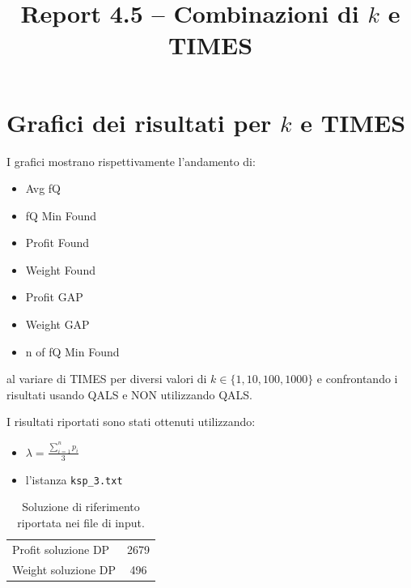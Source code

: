 \documentclass[a4paper,12pt]{article}
\title{Report 4.5 -- Combinazioni di $k$ e TIMES}
\begin{document}
\maketitle

\newpage

\section{Grafici dei risultati per $k$ e TIMES}

I grafici mostrano rispettivamente l'andamento di:
\begin{itemize}
    \item Avg fQ
    \item fQ Min Found
    \item Profit Found
    \item Weight Found
    \item Profit GAP
    \item Weight GAP
    \item n of fQ Min Found
\end{itemize}
al variare di TIMES per diversi valori di $k \in \{1,10,100,1000\}$ e confrontando
i risultati usando QALS e NON utilizzando QALS.

I risultati riportati sono stati ottenuti utilizzando:

\begin{itemize}
   \item $\lambda = \frac{\sum_{i=1}^{n} p_i}{3}$
    \item l'istanza \texttt{ksp\_3.txt}
\end{itemize}

\begin{table}[H]
\centering
\begin{tabular}{lc}
\hline
Profit soluzione DP & 2679 \\
Weight soluzione DP & 496 \\
\hline
\end{tabular}
\caption{Soluzione di riferimento riportata nei file di input.}
\label{tab:knapsack-solution}
\end{table}
\end{document}
